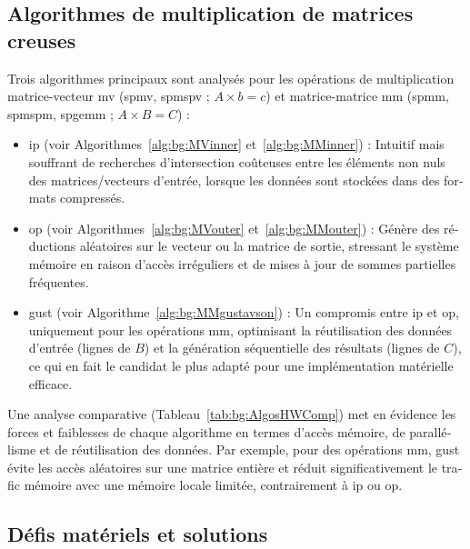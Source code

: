 \begin{otherlanguage}{french}
\subsection*{Algorithmes de multiplication de matrices creuses}

Trois algorithmes principaux sont analysés pour les opérations de multiplication matrice-vecteur \acrshort{mv} (\acrshort{spmv}, \acrshort{spmspv} ; $A \times b = c$) et matrice-matrice \acrshort{mm} (\acrshort{spmm}, \acrshort{spmspm}, \acrshort{spgemm} ; $A \times B = C$) :
\begin{itemize}
    \item \acrfull{ip} (voir Algorithmes~\ref{alg:bg:MVinner} et~\ref{alg:bg:MMinner}) : Intuitif mais souffrant de recherches d'intersection coûteuses entre les éléments non nuls des matrices/vecteurs d'entrée, lorsque les données sont stockées dans des formats compressés.
    \item \acrfull{op} (voir Algorithmes~\ref{alg:bg:MVouter} et~\ref{alg:bg:MMouter}) : Génère des réductions aléatoires sur le vecteur ou la matrice de sortie, stressant le système mémoire en raison d'accès irréguliers et de mises à jour de sommes partielles fréquentes.
    \item \acrfull{gust} (voir Algorithme~\ref{alg:bg:MMgustavson}) : Un compromis entre \acrshort{ip} et \acrshort{op}, uniquement pour les opérations \acrshort{mm}, optimisant la réutilisation des données d'entrée (lignes de $B$) et la génération séquentielle des résultats (lignes de $C$), ce qui en fait le candidat le plus adapté pour une implémentation matérielle efficace.
\end{itemize}

Une analyse comparative (Tableau~\ref{tab:bg:AlgosHWComp}) met en évidence les forces et faiblesses de chaque algorithme en termes d'accès mémoire, de parallélisme et de réutilisation des données.
Par exemple, pour des opérations \acrshort{mm}, \acrshort{gust} évite les accès aléatoires sur une matrice entière et réduit significativement le trafic mémoire avec une mémoire locale limitée, contrairement à \acrshort{ip} ou \acrshort{op}.

\subsection*{Défis matériels et solutions}


\end{otherlanguage}
